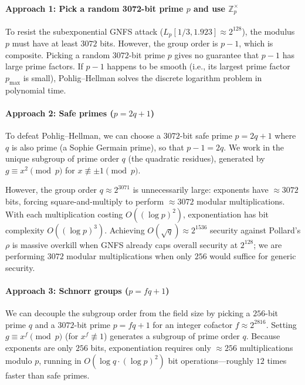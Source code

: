 \paragraph*{Approach 1: Pick a random 3072-bit prime \(p\) and use \(\mathbb{Z}_p^\times\)}

To resist the subexponential GNFS attack (\(L_p[1/3, 1.923] \approx 2^{128}\)), the modulus \(p\) must have at least \(3072\) bits.
However, the group order is \(p - 1\), which is composite.
Picking a random \(3072\)-bit prime \(p\) gives no guarantee that \(p - 1\) has large prime factors.
If \(p - 1\) happens to be smooth (i.e., its largest prime factor \(p_{\max}\) is small), Pohlig--Hellman solves the discrete logarithm problem in polynomial time.

\paragraph*{Approach 2: Safe primes (\(p = 2q + 1\))}

To defeat Pohlig--Hellman, we can choose a \(3072\)-bit safe prime \(p = 2q + 1\) where \(q\) is also prime (a Sophie Germain prime), so that \(p - 1 = 2q\).
We work in the unique subgroup of prime order \(q\) (the quadratic residues), generated by \(g \equiv x^2 \pmod p\) for \(x \not\equiv \pm 1 \pmod p\).

However, the group order \(q \approx 2^{3071}\) is unnecessarily large: exponents have \(\approx 3072\) bits, forcing square-and-multiply to perform \(\approx 3072\) modular multiplications.
With each multiplication costing \(O((\log p)^2)\), exponentiation has bit complexity \(O((\log p)^3)\).
Achieving \(O(\sqrt{q}) \approx 2^{1536}\) security against Pollard's \(\rho\) is massive overkill when GNFS already caps overall security at \(2^{128}\); we are performing \(3072\) modular multiplications when only \(256\) would suffice for generic security.

\paragraph*{Approach 3: Schnorr groups (\(p = fq + 1\))}

We can decouple the subgroup order from the field size by picking a \(256\)-bit prime \(q\) and a \(3072\)-bit prime \(p = fq + 1\) for an integer cofactor \(f \approx 2^{2816}\).
Setting \(g \equiv x^f \pmod p\) (for \(x^f \not\equiv 1\)) generates a subgroup of prime order \(q\).
Because exponents are only \(256\) bits, exponentiation requires only \(\approx 256\) multiplications modulo \(p\), running in \(O(\log q \cdot (\log p)^2)\) bit operations---roughly \(12\) times faster than safe primes.


